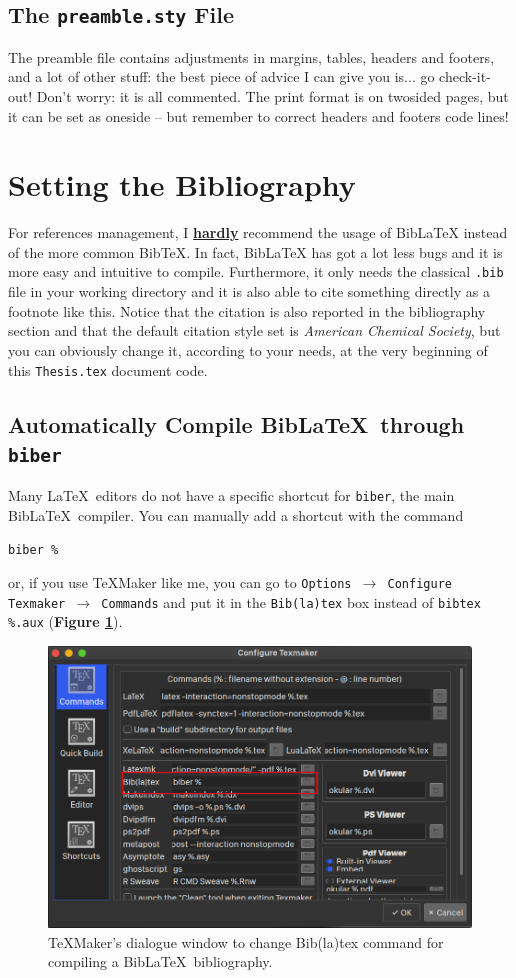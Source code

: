 \documentclass[12pt,a4paper,twoside]{book}
\begin{document}
\subsection*{The \texttt{preamble.sty} File}
The preamble file contains adjustments in margins, tables, headers and footers, and a lot of other stuff: the best piece of advice I can give you is... {\color{reddy} go check-it-out}! Don't worry: it is all commented. The print format is on twosided pages, but it can be set as oneside -- but remember to correct headers and footers code lines!

\section*{Setting the Bibliography}
For references management, I \underline{\color{reddy} \bf hardly} recommend the usage of {\color{reddy} Bib\LaTeX}  instead of the more common Bib\TeX . In fact, {\color{reddy} Bib\LaTeX} has got a lot less bugs and it is more easy and intuitive to compile. Furthermore, it only needs the classical \verb|.bib| file in your working directory and it is also able to cite something directly as a footnote like this. Notice that the citation is also reported in the bibliography section and that the default citation style set is \textit{American Chemical Society}, but you can obviously change it, according to your needs, at the very beginning of this {\color{reddy} \verb|Thesis.tex|} document code.

\subsection*{Automatically Compile Bib\LaTeX \ through \tt biber}
Many \LaTeX \ editors do not have a specific shortcut for {\color{reddy} \verb|biber|}, the main Bib\LaTeX\ compiler. You can manually add a shortcut with the command
\begin{verbatim}
biber %
\end{verbatim}
 or, if you use \TeX Maker like me, you can go to {\color{reddy} \texttt{Options $\to$ Configure Texmaker $\to$ Commands}} and put it in the \verb|Bib(la)tex| box instead of \verb|bibtex %.aux| ({\color{reddy}\bf Figure \ref{window}}).

\begin{figure}[h]
\centering
\includegraphics[width=.7\textwidth]{biber}
\caption{\TeX Maker's dialogue window to change Bib(la)tex command for compiling a Bib\LaTeX\ bibliography.}
\label{window}
\end{figure}
\end{document}

